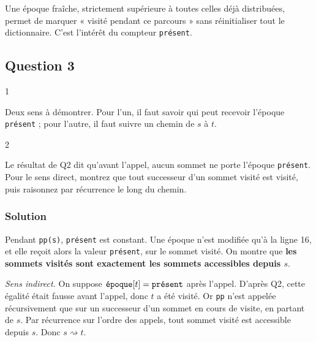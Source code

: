 \documentclass[11pt,a4paper]{article}
\begin{document}
\begin{methode}

Une époque fraîche, strictement supérieure à toutes celles déjà distribuées, permet de marquer « visité pendant ce parcours » sans réinitialiser tout le dictionnaire. C'est l'intérêt du compteur \texttt{présent}.

\end{methode}

\hypertarget{question-3}{%
\subsection{Question 3}\label{question-3}}

\begin{indication}{1}

Deux sens à démontrer. Pour l'un, il faut savoir qui peut recevoir l'époque \texttt{présent} ; pour l'autre, il faut suivre un chemin de \(s\) à \(t\).

\end{indication}

\begin{indication}{2}

Le résultat de Q2 dit qu'avant l'appel, aucun sommet ne porte l'époque \texttt{présent}. Pour le sens direct, montrez que tout successeur d'un sommet visité est visité, puis raisonnez par récurrence le long du chemin.

\end{indication}

\hypertarget{solution-2}{%
\subsubsection{Solution}\label{solution-2}}

Pendant \texttt{pp(s)}, \texttt{présent} est constant. Une époque n'est modifiée qu'à la ligne 16, et elle reçoit alors la valeur \texttt{présent}, sur le sommet visité. On montre que \textbf{les sommets visités sont exactement les sommets accessibles depuis \(s\)}.

\emph{Sens indirect.} On suppose \(\texttt{\text{époque}}[t]=\texttt{\text{présent}}\) après l'appel. D'après Q2, cette égalité était fausse avant l'appel, donc \(t\) a été visité. Or \texttt{pp} n'est appelée récursivement que sur un successeur d'un sommet en cours de visite, en partant de \(s\). Par récurrence sur l'ordre des appels, tout sommet visité est accessible depuis \(s\). Donc \(s\rightsquigarrow t\).
\end{document}
